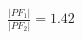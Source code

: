 \documentclass[preview]{standalone}
\begin{document}
\begin{align*}
\frac{|PF_1|}{|PF_2|} = 1.42
\end{align*}
\end{document}
